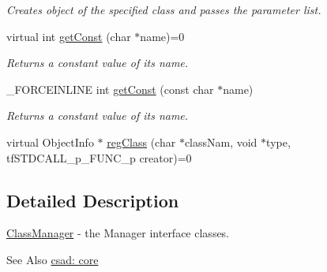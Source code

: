 \begin{DoxyCompactItemize}
\begin{DoxyCompactList}\small\item\em Creates object of the specified class and passes the parameter list. \end{DoxyCompactList}\item 
\hypertarget{classcsad_1_1_class_manager_a19ed7fb2c1775b5b5b69c65d4ad98a30}{virtual int \hyperlink{classcsad_1_1_class_manager_a19ed7fb2c1775b5b5b69c65d4ad98a30}{get\-Const} (char $\ast$name)=0}\label{classcsad_1_1_class_manager_a19ed7fb2c1775b5b5b69c65d4ad98a30}

\begin{DoxyCompactList}\small\item\em Returns a constant value of its name. \end{DoxyCompactList}\item 
\hypertarget{classcsad_1_1_class_manager_a99c542560743638f818f8cf3298fa51c}{\-\_\-\-F\-O\-R\-C\-E\-I\-N\-L\-I\-N\-E int \hyperlink{classcsad_1_1_class_manager_a99c542560743638f818f8cf3298fa51c}{get\-Const} (const char $\ast$name)}\label{classcsad_1_1_class_manager_a99c542560743638f818f8cf3298fa51c}

\begin{DoxyCompactList}\small\item\em Returns a constant value of its name. \end{DoxyCompactList}\item 
virtual Object\-Info $\ast$ \hyperlink{classcsad_1_1_class_manager_a6dbd4e3a0717199a827ca874f631723b}{reg\-Class} (char $\ast$class\-Nam, void $\ast$type, tf\-S\-T\-D\-C\-A\-L\-L\-\_\-p\-\_\-\-F\-U\-N\-C\-\_\-p creator)=0
\end{DoxyCompactItemize}


\subsection{Detailed Description}
\hyperlink{classcsad_1_1_class_manager}{Class\-Manager} -\/ the Manager interface classes. 

\begin{DoxySeeAlso}{See Also}
\hyperlink{group__core}{csad\-: core} 
\end{DoxySeeAlso}


